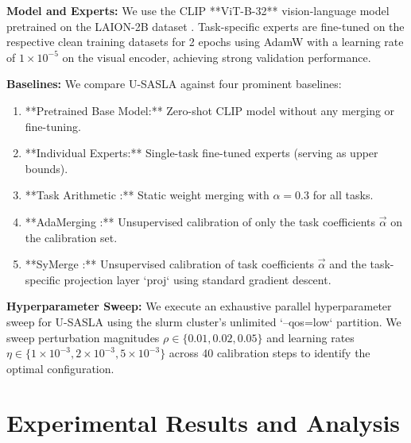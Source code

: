 \documentclass{article}
\theoremstyle{plain}
\theoremstyle{definition}
\theoremstyle{remark}
\begin{document}
\textbf{Model and Experts:} We use the CLIP **ViT-B-32** vision-language model \cite{clip} pretrained on the LAION-2B dataset \cite{openclip}. Task-specific experts are fine-tuned on the respective clean training datasets for 2 epochs using AdamW with a learning rate of $1\times 10^{-5}$ on the visual encoder, achieving strong validation performance.

\textbf{Baselines:} We compare U-SASLA against four prominent baselines:
\begin{enumerate}
    \item **Pretrained Base Model:** Zero-shot CLIP model without any merging or fine-tuning.
    \item **Individual Experts:** Single-task fine-tuned experts (serving as upper bounds).
    \item **Task Arithmetic \cite{task_arithmetic}:** Static weight merging with $\alpha=0.3$ for all tasks.
    \item **AdaMerging \cite{adamerging}:** Unsupervised calibration of only the task coefficients $\vec{\alpha}$ on the calibration set.
    \item **SyMerge \cite{symerge}:** Unsupervised calibration of task coefficients $\vec{\alpha}$ and the task-specific projection layer `proj` using standard gradient descent.
\end{enumerate}

\textbf{Hyperparameter Sweep:} We execute an exhaustive parallel hyperparameter sweep for U-SASLA using the slurm cluster's unlimited `--qos=low` partition. We sweep perturbation magnitudes $\rho \in \{0.01, 0.02, 0.05\}$ and learning rates $\eta \in \{1\times 10^{-3}, 2\times 10^{-3}, 5\times 10^{-3}\}$ across 40 calibration steps to identify the optimal configuration.

\section{Experimental Results and Analysis}
\label{results}
\end{document}
